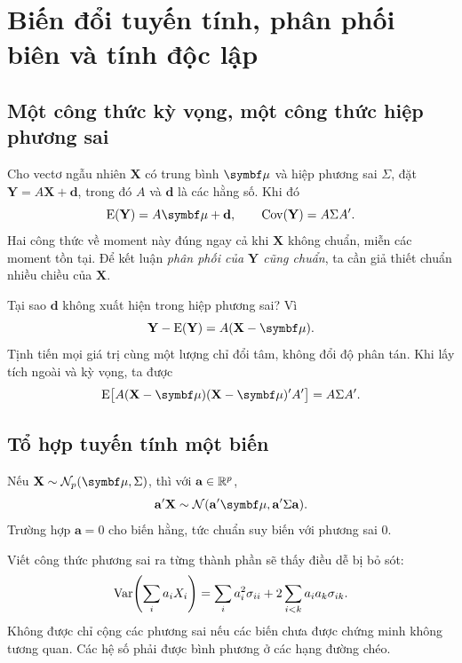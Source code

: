 \clearpage
\section{Biến đổi tuyến tính, phân phối biên và tính độc lập}
\label{sec:linear}

\subsection{Một công thức kỳ vọng, một công thức hiệp phương sai}
Cho vectơ ngẫu nhiên $\mathbf X$ có trung bình $\vmu$ và hiệp phương sai
$\Sigma$, đặt $\mathbf Y=A\mathbf X+\mathbf d$, trong đó $A$ và
$\mathbf d$ là các hằng số. Khi đó
\begin{equation}
 \E(\mathbf Y)=A\vmu+\mathbf d,\qquad
 \Cov(\mathbf Y)=A\Sigma A'.
 \label{eq:linearmeanvar}
\end{equation}
Hai công thức về moment này đúng ngay cả khi $\mathbf X$ không chuẩn, miễn
các moment tồn tại. Để kết luận \emph{phân phối của $\mathbf Y$ cũng chuẩn},
ta cần giả thiết chuẩn nhiều chiều của $\mathbf X$.

Tại sao $\mathbf d$ không xuất hiện trong hiệp phương sai? Vì
\[
 \mathbf Y-\E(\mathbf Y)=A(\mathbf X-\vmu).
\]
Tịnh tiến mọi giá trị cùng một lượng chỉ đổi tâm, không đổi độ phân tán.
Khi lấy tích ngoài và kỳ vọng, ta được
\[
 \E\bigl[A(\mathbf X-\vmu)(\mathbf X-\vmu)'A'\bigr]=A\Sigma A'.
\]

\subsection{Tổ hợp tuyến tính một biến}
\begin{result}
Nếu $\mathbf X\sim\N_p(\vmu,\Sigma)$, thì với $\mathbf a\in\mathbb R^p$,
\begin{equation}
 \mathbf a'\mathbf X\sim\N(\mathbf a'\vmu,\mathbf a'\Sigma\mathbf a).
 \label{eq:unilinear}
\end{equation}
Trường hợp $\mathbf a=0$ cho biến hằng, tức chuẩn suy biến với phương sai 0.
\end{result}

Viết công thức phương sai ra từng thành phần sẽ thấy điều dễ bị bỏ sót:
\[
 \operatorname{Var}\!\left(\sum_i a_iX_i\right)
 =\sum_i a_i^2\sigma_{ii}+2\sum_{i<k}a_i a_k\sigma_{ik}.
\]
Không được chỉ cộng các phương sai nếu các biến chưa được chứng minh không
tương quan. Các hệ số phải được bình phương ở các hạng đường chéo.

